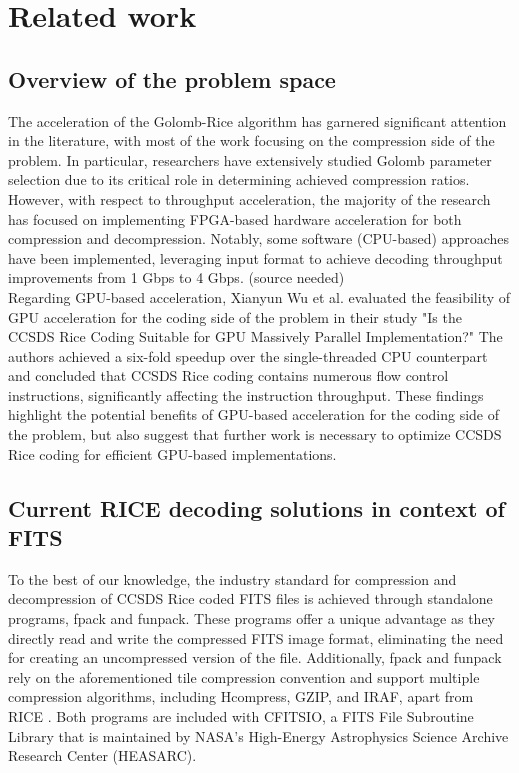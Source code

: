 \documentclass[licencjacka,en]{pracamgr}
\begin{document}
\chapter{Related work}

\section{Overview of the problem space}
The acceleration of the Golomb-Rice algorithm has garnered significant attention in the literature, with most of the work focusing on the compression side of the problem. In particular, researchers have extensively studied Golomb parameter selection due to its critical role in determining achieved compression ratios. However, with respect to throughput acceleration, the majority of the research has focused on implementing FPGA-based hardware acceleration for both compression and decompression. Notably, some software (CPU-based) approaches have been implemented, leveraging input format to achieve decoding throughput improvements from 1 Gbps to 4 Gbps. (source needed)\\

Regarding GPU-based acceleration, Xianyun Wu et al. evaluated the feasibility of GPU acceleration for the coding side of the problem in their study "Is the CCSDS Rice Coding Suitable for GPU Massively Parallel Implementation?" The authors achieved a six-fold speedup over the single-threaded CPU counterpart and concluded that CCSDS Rice coding contains numerous flow control instructions, significantly affecting the instruction throughput. These findings highlight the potential benefits of GPU-based acceleration for the coding side of the problem, but also suggest that further work is necessary to optimize CCSDS Rice coding for efficient GPU-based implementations.

\newpage
\section{Current RICE decoding solutions in context of FITS}
To the best of our knowledge, the industry standard for compression and decompression of CCSDS Rice coded FITS files is achieved through standalone programs, fpack and funpack. These programs offer a unique advantage as they directly read and write the compressed FITS image format, eliminating the need for creating an uncompressed version of the file. Additionally, fpack and funpack rely on the aforementioned tile compression convention and support multiple compression algorithms, including Hcompress, GZIP, and IRAF, apart from RICE \cite{funpack}. Both programs are included with CFITSIO, a FITS File Subroutine Library that is maintained by NASA’s High-Energy Astrophysics Science Archive Research Center (HEASARC)\cite{cfitsio}.\\
\end{document}
